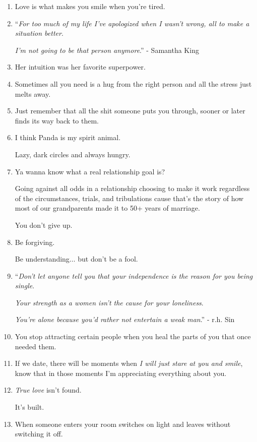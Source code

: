 \documentclass{article}
\numberwithin{equation}{section}
\begin{document}
\begin{enumerate}
    People can pretend to do a lot without being serious about it.
    \item Love is what makes you smile when you're tired.
    \item ``\textit{For too much of my life I've apologized when I wasn't wrong, all to make a situation better}.
    
    \textit{I'm not going to be that person anymore}.'' - Samantha King
    \item Her intuition was her favorite superpower.
    \item Sometimes all you need is a hug from the right person and all the stress just melts away.
    \item Just remember that all the shit someone puts you through, sooner or later finds its way back to them.
    \item I think Panda is my spirit animal.
    
    Lazy, dark circles and always hungry.
    \item Ya wanna know what a real relationship goal is?
    
    Going against all odds in a relationship choosing to make it work regardless of the circumstances, trials, and tribulations cause that's the story of how most of our grandparents made it to 50+ years of marriage.
    
    You don't give up.
    \item Be forgiving.
    
    Be understanding$\ldots$ but don't be a fool.
    \item ``\textit{Don't let anyone tell you that your independence is the reason for you being single}.
    
    \textit{Your strength as a women isn't the cause for your loneliness}.
    
    \textit{You're alone because you'd rather not entertain a weak man}.'' - r.h. Sin
    \item You stop attracting certain people when you heal the parts of you that once needed them.
    \item If we date, there will be moments when \textit{I will just stare at you and smile}, know that in those moments I'm appreciating everything about you.
    \item \textit{True love} isn't found.
    
    It's built.
    \item When someone enters your room switches on light and leaves without switching it off.
    

\end{enumerate}
\end{document}
